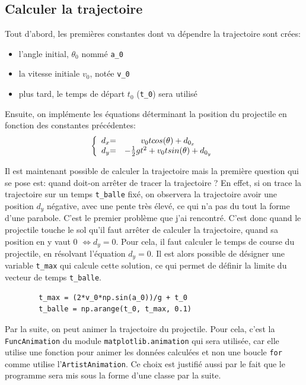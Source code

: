 \documentclass[a4paper,11pt]{article}
\begin{document}
\subsection{Calculer la trajectoire}
Tout d'abord, les premières constantes dont va dépendre la trajectoire sont crées:
\begin{itemize}
	\item l'angle initial, $\theta_0$ nommé \verb|a_0|
	\item la vitesse initiale $v_0$, notée \verb|v_0|
	\item plus tard, le temps de départ $t_0$ (\verb|t_0|) sera utilisé
\end{itemize}
Ensuite, on implémente les équations déterminant la position du projectile en fonction des constantes précédentes:
\[ \left \{
\begin{array}{c @{= \quad} c}
	d_x & v_0 t cos (\theta) + d_{0_x}\\
	d_y &- \frac{1}{2} g t^2 + v_0 t sin(\theta) + d_{0_y}
\end{array}
\right. \]

Il est maintenant possible de calculer la trajectoire mais la première question qui se pose est: quand doit-on arrêter de tracer la trajectoire ? En effet, si on trace la trajectoire sur un temps \verb|t_balle| fixé, on observera la trajectoire avoir une position $d_y$ négative, avec une pente très élevé, ce qui n'a pas du tout la forme d'une parabole. C'est le premier problème que j'ai rencontré. C'est donc quand le projectile touche le sol qu'il faut arrêter de calculer la trajectoire, quand sa position en y vaut 0 $\Leftrightarrow d_y = 0$. Pour cela, il faut calculer le temps de course du projectile, en résolvant l'équation $d_y = 0$. Il est alors possible de désigner une variable \verb|t_max| qui calcule cette solution, ce qui permet de définir la limite du vecteur de temps \verb|t_balle|.
	\begin{verbatim}
		t_max = (2*v_0*np.sin(a_0))/g + t_0   
		t_balle = np.arange(t_0, t_max, 0.1)
	\end{verbatim}

Par la suite, on peut animer la trajectoire du projectile. Pour cela, c'est la \verb|FuncAnimation| du module \verb|matplotlib.animation| qui sera utilisée, car elle utilise une fonction pour animer les données calculées et non une boucle \verb|for| comme utilise l'\verb|ArtistAnimation|. Ce choix est justifié aussi par le fait que le programme sera mis sous la forme d'une classe par la suite. 
\end{document}
